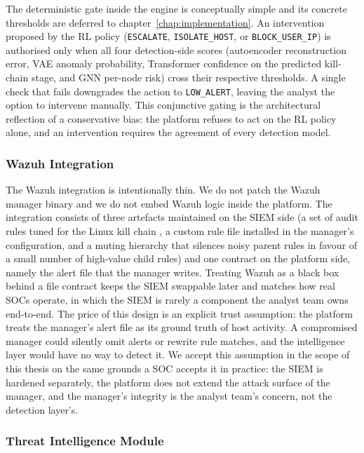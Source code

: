 The deterministic gate inside the engine is conceptually simple and
its concrete thresholds are deferred to chapter~\ref{chap:implementation}.
An intervention proposed by the RL policy
(\texttt{ESCALATE}, \texttt{ISOLATE\_HOST}, or \texttt{BLOCK\_USER\_IP})
is authorised only when all four detection-side scores
(autoencoder reconstruction error, VAE anomaly probability,
Transformer confidence on the predicted kill-chain stage, and GNN
per-node risk) cross their respective thresholds. A single check
that fails downgrades the action to \texttt{LOW\_ALERT}, leaving the
analyst the option to intervene manually. This conjunctive gating
is the architectural reflection of a conservative bias: the platform
refuses to act on the RL policy alone, and an intervention requires
the agreement of every detection model.

\subsubsection{Wazuh Integration}

The Wazuh integration is intentionally thin. We do not patch the Wazuh
manager binary and we do not embed Wazuh logic inside the platform.
The integration consists of three artefacts maintained on the SIEM
side (a set of audit rules tuned for the Linux kill chain
\cite{auditd2024}, a custom rule file installed in the manager's
configuration, and a muting hierarchy that silences noisy parent rules
in favour of a small number of high-value child rules) and one
contract on the platform side, namely the alert file that the manager
writes. Treating Wazuh as a black box behind a file contract keeps
the SIEM swappable later and matches how real SOCs operate, in which
the SIEM is rarely a component the analyst team owns end-to-end. The price of this design is an explicit trust
assumption: the platform treats the manager's alert file as its
ground truth of host activity. A compromised manager could silently
omit alerts or rewrite rule matches, and the intelligence layer would
have no way to detect it. We accept this assumption in the scope of
this thesis on the same grounds a SOC accepts it in practice: the
SIEM is hardened separately, the platform does not extend the attack
surface of the manager, and the manager's integrity is the analyst
team's concern, not the detection layer's.

\subsubsection{Threat Intelligence Module}

